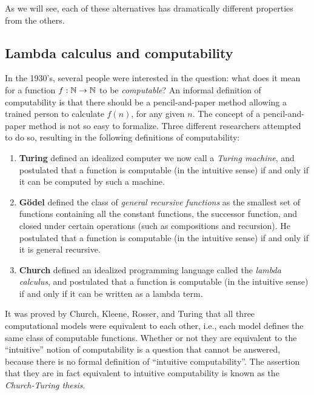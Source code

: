 \documentclass{article}
\begin{document}
As we will see, each of these alternatives has dramatically different
properties from the others.

\subsection{Lambda calculus and computability}

In the 1930's, several people were interested in the question: what
does it mean for a function $f:\mathbb{N}\to\mathbb{N}$ to be {\em computable}? An
informal definition of computability is that there should be a
pencil-and-paper method allowing a trained person to calculate $f(n)$,
for any given $n$. The concept of a pencil-and-paper method is not so
easy to formalize. Three different researchers attempted to do so,
resulting in the following definitions of computability:

\begin{enumerate}
\item {\bf Turing} defined an idealized computer we now call a {\em
    Turing machine}, and postulated that a function is computable (in
  the intuitive sense) if and only if it can be computed by such a
  machine.
\item {\bf G\"odel} defined the class of {\em general recursive
    functions} as the smallest set of functions containing all the
  constant functions, the successor function, and closed under certain
  operations (such as compositions and recursion). He postulated that
    a function is computable (in the intuitive sense) if and only if
    it is general recursive.
\item {\bf Church} defined an idealized programming language called
  the {\em lambda calculus}, and postulated that a function is
  computable (in the intuitive sense) if and only if it can be
  written as a lambda term.
\end{enumerate}

It was proved by Church, Kleene, Rosser, and Turing that all three
computational models were equivalent to each other, i.e., each model
defines the same class of computable functions. Whether or not they
are equivalent to the ``intuitive'' notion of computability is a
question that cannot be answered, because there is no formal
definition of ``intuitive computability''. The assertion that they are
in fact equivalent to intuitive computability is known as the {\em
  Church-Turing thesis}.

\end{document}
